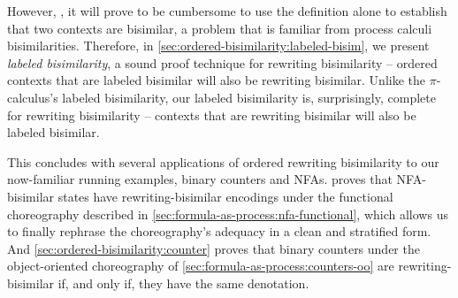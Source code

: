 However, , it will prove to be cumbersome to use the definition alone to establish that two contexts are bisimilar, a problem that is familiar from process calculi bisimilarities.
Therefore, in \cref{sec:ordered-bisimilarity:labeled-bisim}, we present \emph{labeled bisimilarity}, a sound proof technique for rewriting bisimilarity -- ordered contexts that are labeled bisimilar will also be rewriting bisimilar.
Unlike the $\pi$-calculus's labeled bisimilarity, our labeled bisimilarity is, surprisingly, complete for rewriting bisimilarity -- contexts that are rewriting bisimilar will also be labeled bisimilar.

This  concludes with several applications of ordered rewriting bisimilarity to our now-familiar running examples, binary counters and \aclp*{NFA}.
 proves that \ac{NFA}-bisimilar states have rewriting-bisimilar encodings under the functional choreography described in \cref{sec:formula-as-process:nfa-functional}, which allows us to finally rephrase the choreography's adequacy in a clean and stratified form.
And \cref{sec:ordered-bisimilarity:counter} proves that binary counters under the object-oriented choreography of \cref{sec:formula-as-process:counters-oo} are rewriting-bisimilar if, and only if, they have the same denotation.





